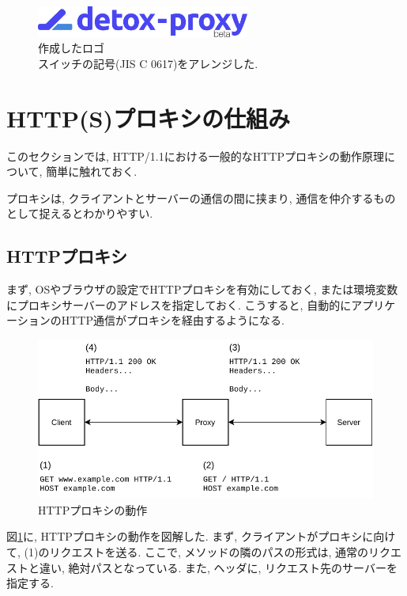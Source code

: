 \documentclass[a4paper,uplatex,a4j,dvipdfmx]{jsarticle}
\begin{document}
\begin{multicols}{2}
    \begin{figure}[H]
      \center
      \includegraphics[width=7cm]{img/logo.eps}
      \caption{作成したロゴ \\ スイッチの記号(JIS C 0617)をアレンジした.}
    \end{figure}

    \section{HTTP(S)プロキシの仕組み}
    
    このセクションでは, HTTP/1.1における一般的なHTTPプロキシの動作原理について, 簡単に触れておく.

    プロキシは, クライアントとサーバーの通信の間に挟まり, 通信を仲介するものとして捉えるとわかりやすい.
    
    \subsection{HTTPプロキシ}
    \label{sec:http}
    まず, OSやブラウザの設定でHTTPプロキシを有効にしておく, または環境変数にプロキシサーバーのアドレスを指定しておく.
    こうすると, 自動的にアプリケーションのHTTP通信がプロキシを経由するようになる.
    \begin{figure}[tb]
      \center
      \includegraphics[width=14cm]{img/proxyhttp.pdf}
      \caption{HTTPプロキシの動作 \label{img:proxy:http}}
    \end{figure}
    
    図\ref{img:proxy:http}に, HTTPプロキシの動作を図解した.
    まず, クライアントがプロキシに向けて, (1)のリクエストを送る.
    ここで, メソッドの隣のパスの形式は, 通常のリクエストと違い, 絶対パスとなっている. また, ヘッダに, リクエスト先のサーバーを指定する.
    

\end{multicols}
\end{document}
